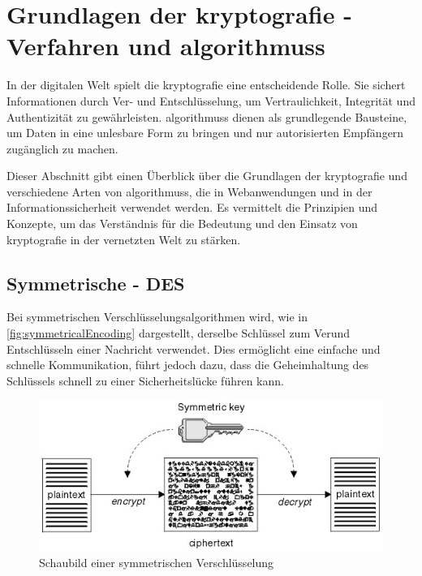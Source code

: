 \newpage


\section[Grundlagen der Kryptografie - Kryptografische Verfahren und Algorithmen]{Grundlagen der \gls{kryptografie} -  Verfahren und \glspl{algorithmus}}\label{sec:grundlagen-der-kryptografie}


In der digitalen Welt spielt die \Gls{kryptografie} eine entscheidende Rolle.
Sie sichert Informationen durch Ver- und Entschlüsselung, um Vertraulichkeit, Integrität und Authentizität zu gewährleisten.
 \glspl{algorithmus} dienen als grundlegende Bausteine, um Daten in eine unlesbare Form zu bringen und nur autorisierten Empfängern zugänglich zu machen.

Dieser Abschnitt gibt einen Überblick über die Grundlagen der \Gls{kryptografie} und verschiedene Arten von \glspl{algorithmus}, die in Webanwendungen und in der Informationssicherheit verwendet werden.
Es vermittelt die Prinzipien und Konzepte, um das Verständnis für die Bedeutung und den Einsatz von \Gls{kryptografie} in der vernetzten Welt zu stärken.


\subsection[Symmetrische Verschlüsselungsalgorithmen]{Symmetrische  - \acf{DES}}\label{subsec:symmetrsiche-algorithmen}
Bei symmetrischen Verschlüsselungsalgorithmen wird, wie in \autoref{fig:symmetricalEncoding}\autocite{Chapter211:online} dargestellt, derselbe Schlüssel zum Ver\nonbreakdash und Entschlüsseln einer Nachricht verwendet.
Dies ermöglicht eine einfache und schnelle Kommunikation, führt jedoch dazu, dass die Geheimhaltung des Schlüssels schnell zu einer Sicherheitslücke führen kann.

\begin{figure}[htbp]
    \includegraphics[width=1\linewidth]{src/abbildungen/symmetricEncoding}
    \centering
    \caption[
        Schaubild einer symmetrischen Verschlüsselung]{Schaubild einer symmetrischen Verschlüsselung\footnotemark}
    \label{fig:symmetricalEncoding}
\end{figure}\ 


